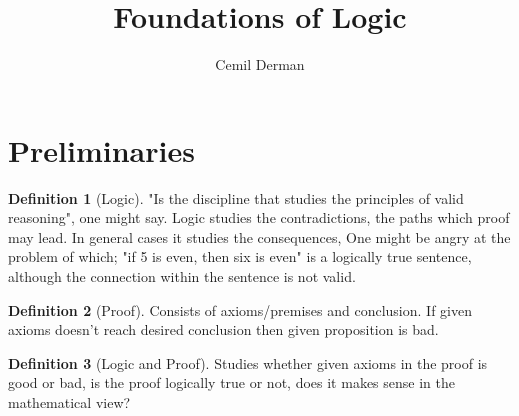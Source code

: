 \documentclass[12pt]{article}
\title{Foundations of Logic}
\author{Cemil Derman}
\date{}
\theoremstyle{definition}
\newtheorem{definition}{Definition}[section]
\theoremstyle{plain}
\begin{document}
\maketitle

\section{Preliminaries}

\begin{definition}[Logic]
"Is the discipline that studies the principles of valid reasoning", one might say.
  Logic studies the contradictions, the paths which proof may lead. In general cases it studies the consequences,
  One might be angry at the problem of which;
  "if 5 is even, then six is even" is a logically true sentence, although the connection within the sentence is not valid.

\end{definition}

\begin{definition}[Proof]
       Consists of axioms/premises and conclusion.
    If given axioms doesn't reach desired conclusion then given proposition is bad. 

\end{definition}
\begin{definition}[Logic and Proof]
  Studies whether given axioms in the proof is good or bad,
  is the proof logically true or not, does it makes sense in the mathematical view?
  
\end{definition}
\end{document}
